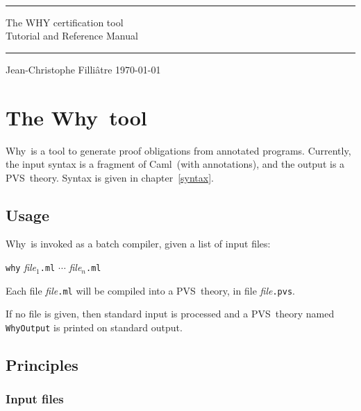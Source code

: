 \documentclass[a4paper,12pt]{report}
\newcommand{\caml}{\textsf{Caml}}
\newcommand{\pvs}{\textsf{PVS}}
\newcommand{\why}{\textsf{Why}}
\begin{document}
\thispagestyle{empty}
\begin{center}
~\\[3cm]
\rule\textwidth{0.1cm}\\[0.5cm]
{\Huge\sf The WHY certification tool}\\[1cm]
{\Large\sf Tutorial and Reference Manual}\\[0.1cm]
\rule\textwidth{0.1cm}\\[3cm]
Jean-Christophe Filli\^atre
\vfill
\today\\
\end{center}

\tableofcontents

\chapter{The \why\ tool}

\why\ is a tool to generate proof obligations from annotated programs.
Currently, the input syntax is a fragment of \caml\ (with annotations),
and the output is a \pvs\ theory. Syntax is given in chapter~\ref{syntax}.


\section{Usage}

\why\ is invoked as a batch compiler, given a list of input files:
\begin{center}
  \texttt{why} \textit{file}$_1$\texttt{.ml} $\cdots$
    \textit{file}$_n$\texttt{.ml}
\end{center}
Each file \textit{file}\texttt{.ml} will be compiled into a \pvs\ theory,
in file \textit{file}\texttt{.pvs}.

If no file is given, then standard input is processed and a \pvs\ theory
named \texttt{WhyOutput} is printed on standard output.


\section{Principles}

\subsection{Input files}
\end{document}
